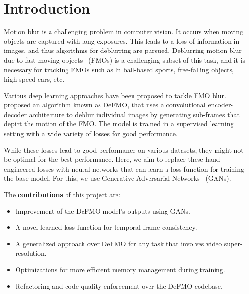 \section{Introduction}

Motion blur is a challenging problem in computer vision.
It occurs when moving objects are captured with long exposures.
This leads to a loss of information in images, and thus algorithms for deblurring are pursued.
Deblurring motion blur due to fast moving objects~\citep{fmo} (FMOs) is a challenging subset of this task, and it is necessary for tracking FMOs such as in ball-based sports, free-falling objects, high-speed cars, etc.

Various deep learning approaches have been proposed to tackle FMO blur.
\citet{defmo} proposed an algorithm known as DeFMO, that uses a convolutional encoder-decoder architecture to deblur individual images by generating sub-frames that depict the motion of the FMO.\@
The model is trained in a supervised learning setting with a wide variety of losses for good performance.

While these losses lead to good performance on various datasets, they might not be optimal for the best performance.
Here, we aim to replace these hand-engineered losses with neural networks that can learn a loss function for training the base model.
For this, we use Generative Adversarial Networks~\citep{gan} (GANs).

The \textbf{contributions} of this project are:
\begin{itemize}
    \item Improvement of the DeFMO model's outputs using GANs.
    \item A novel learned loss function for temporal frame consistency.
    \item A generalized approach over DeFMO for any task that involves video super-resolution.
    \item Optimizations for more efficient memory management during training.
    \item Refactoring and code quality enforcement over the DeFMO codebase.
\end{itemize}
